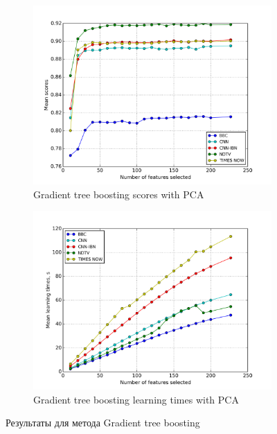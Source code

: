 \begin{figure}[h!]
    \centering
	\begin{subfigure}{0.45\textwidth}
		\includegraphics[width=\textwidth]{images/PCA-GTB.png}
		\caption{Gradient tree boosting scores with PCA}
	\end{subfigure}
	\begin{subfigure}{0.45\textwidth}
		\includegraphics[width=\textwidth]{images/PCA-GTBTime.png}
		\caption{Gradient tree boosting learning times with PCA}
	\end{subfigure}
	\caption{Результаты для метода Gradient tree boosting}\label{fig:gtb_pca}
\end{figure}

\par
